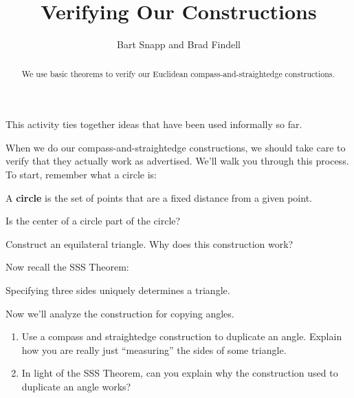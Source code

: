 \documentclass[nooutcomes]{ximera}
\title{Verifying Our Constructions}
\author{Bart Snapp and Brad Findell}
\begin{document}
\begin{abstract}
  We use basic theorems to verify our Euclidean compass-and-straightedge constructions.
\end{abstract}
\maketitle

\begin{teachingnote}
This activity ties together ideas that have been used informally so far.  
\end{teachingnote}

When we do our compass-and-straightedge constructions, we should take
care to verify that they actually work as advertised. We'll walk you
through this process. To start, remember what a circle is:

\begin{definition} 
A \textbf{circle} is the set of points that are a fixed distance from
a given point.
\end{definition}

\begin{problem} Is the center of a circle part of the circle?
\end{problem}

\begin{problem} 
Construct an equilateral triangle.  Why does this construction work?
\end{problem}




Now recall the SSS Theorem:

\begin{theorem}[SSS] 
Specifying three sides uniquely determines a triangle.
\end{theorem}



\begin{problem} Now we'll analyze the construction for copying angles. 
\begin{enumerate}
\item Use a compass and straightedge construction to duplicate an
  angle. Explain how you are really just ``measuring'' the sides of
  some triangle.
\item In light of the SSS Theorem, can you explain why the
  construction used to duplicate an angle works?
\end{enumerate}
\end{problem}
\end{document}
